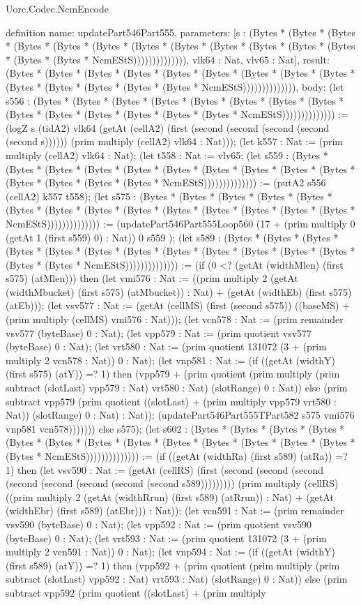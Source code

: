 \begin{lexlean}{Uorc.Codec.NcmEncode}
\begin{semanticmodule}
definition{
  name: updatePart546Part555,
  parameters: [s : (Bytes * (Bytes * (Bytes * (Bytes * (Bytes * (Bytes * (Bytes * (Bytes * (Bytes * (Bytes * (Bytes * (Bytes * (Bytes * (Bytes * NcmEStS)))))))))))))), vlk64 : Nat, vlv65 : Nat],
  result: (Bytes * (Bytes * (Bytes * (Bytes * (Bytes * (Bytes * (Bytes * (Bytes * (Bytes * (Bytes * (Bytes * (Bytes * (Bytes * (Bytes * NcmEStS)))))))))))))),
  body: (let s556 : (Bytes * (Bytes * (Bytes * (Bytes * (Bytes * (Bytes * (Bytes * (Bytes * (Bytes * (Bytes * (Bytes * (Bytes * (Bytes * (Bytes * NcmEStS)))))))))))))) := (logZ s (tidA2) vlk64 (getAt (cellA2) (first (second (second (second (second (second s)))))) (prim multiply (cellA2) vlk64 : Nat))); (let k557 : Nat := (prim multiply (cellA2) vlk64 : Nat); (let t558 : Nat := vlv65; (let s559 : (Bytes * (Bytes * (Bytes * (Bytes * (Bytes * (Bytes * (Bytes * (Bytes * (Bytes * (Bytes * (Bytes * (Bytes * (Bytes * (Bytes * NcmEStS)))))))))))))) := (putA2 s556 (cellA2) k557 t558); (let s575 : (Bytes * (Bytes * (Bytes * (Bytes * (Bytes * (Bytes * (Bytes * (Bytes * (Bytes * (Bytes * (Bytes * (Bytes * (Bytes * (Bytes * NcmEStS)))))))))))))) := (updatePart546Part555Loop560 (17 + (prim multiply 0 (getAt 1 (first s559) 0) : Nat)) 0 s559 ); (let s589 : (Bytes * (Bytes * (Bytes * (Bytes * (Bytes * (Bytes * (Bytes * (Bytes * (Bytes * (Bytes * (Bytes * (Bytes * (Bytes * (Bytes * NcmEStS)))))))))))))) := (if (0 <? (getAt (widthMlen) (first s575) (atMlen))) then (let vmi576 : Nat := ((prim multiply 2 (getAt (widthMbucket) (first s575) (atMbucket)) : Nat) + (getAt (widthEb) (first s575) (atEb))); (let vsv577 : Nat := (getAt (cellMS) (first (second s575)) ((baseMS) + (prim multiply (cellMS) vmi576 : Nat))); (let vcn578 : Nat := (prim remainder vsv577 (byteBase) 0 : Nat); (let vpp579 : Nat := (prim quotient vsv577 (byteBase) 0 : Nat); (let vrt580 : Nat := (prim quotient 131072 (3 + (prim multiply 2 vcn578 : Nat)) 0 : Nat); (let vnp581 : Nat := (if ((getAt (widthY) (first s575) (atY)) =? 1) then (vpp579 + (prim quotient (prim multiply (prim subtract (slotLast) vpp579 : Nat) vrt580 : Nat) (slotRange) 0 : Nat)) else (prim subtract vpp579 (prim quotient ((slotLast) + (prim multiply vpp579 vrt580 : Nat)) (slotRange) 0 : Nat) : Nat)); (updatePart546Part555TPart582 s575 vmi576 vnp581 vcn578))))))) else s575); (let s602 : (Bytes * (Bytes * (Bytes * (Bytes * (Bytes * (Bytes * (Bytes * (Bytes * (Bytes * (Bytes * (Bytes * (Bytes * (Bytes * (Bytes * NcmEStS)))))))))))))) := (if ((getAt (widthRa) (first s589) (atRa)) =? 1) then (let vsv590 : Nat := (getAt (cellRS) (first (second (second (second (second (second (second (second (second s589))))))))) (prim multiply (cellRS) ((prim multiply 2 (getAt (widthRrun) (first s589) (atRrun)) : Nat) + (getAt (widthEbr) (first s589) (atEbr))) : Nat)); (let vcn591 : Nat := (prim remainder vsv590 (byteBase) 0 : Nat); (let vpp592 : Nat := (prim quotient vsv590 (byteBase) 0 : Nat); (let vrt593 : Nat := (prim quotient 131072 (3 + (prim multiply 2 vcn591 : Nat)) 0 : Nat); (let vnp594 : Nat := (if ((getAt (widthY) (first s589) (atY)) =? 1) then (vpp592 + (prim quotient (prim multiply (prim subtract (slotLast) vpp592 : Nat) vrt593 : Nat) (slotRange) 0 : Nat)) else (prim subtract vpp592 (prim quotient ((slotLast) + (prim multiply }
\end{semanticmodule}
\end{lexlean}

